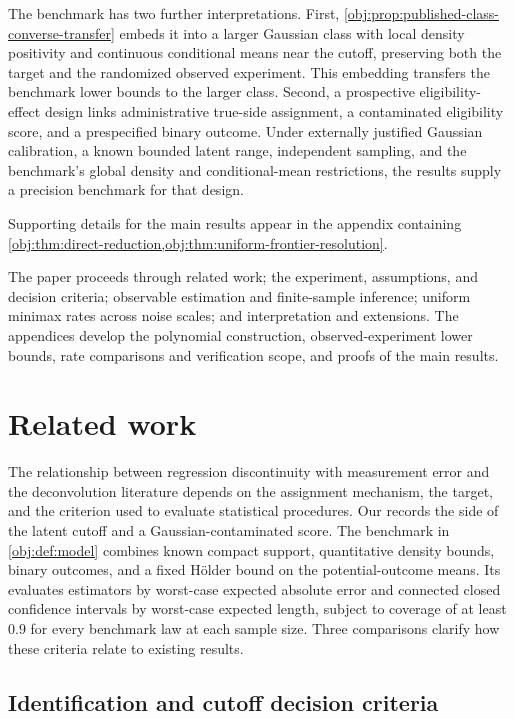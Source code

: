 \documentclass[11pt]{article}
\begin{document}
The benchmark has two further interpretations. First, \cref{obj:prop:published-class-converse-transfer} embeds it into a larger Gaussian class with local density positivity and continuous conditional means near the cutoff, preserving both the target and the randomized observed experiment. This embedding transfers the benchmark lower bounds to the larger class. Second, a prospective eligibility-effect design links administrative true-side assignment, a contaminated eligibility score, and a prespecified binary outcome. Under externally justified Gaussian calibration, a known bounded latent range, independent sampling, and the benchmark's global density and conditional-mean restrictions, the results supply a precision benchmark for that design.

Supporting details for the main results appear in the appendix containing \cref{obj:thm:direct-reduction,obj:thm:uniform-frontier-resolution}.

The paper proceeds through related work; the experiment, assumptions, and decision criteria; observable estimation and finite-sample inference; uniform minimax rates across noise scales; and interpretation and extensions. The appendices develop the polynomial construction, observed-experiment lower bounds, rate comparisons and verification scope, and proofs of the main results.


\section{Related work}\label{sec:related-work}

The relationship between regression discontinuity with measurement error and the deconvolution literature depends on the assignment mechanism, the target, and the criterion used to evaluate statistical procedures. Our  records the side of the latent cutoff and a Gaussian-contaminated score. The benchmark in \cref{obj:def:model} combines known compact support, quantitative density bounds, binary outcomes, and a fixed Hölder bound on the potential-outcome means. Its  evaluates estimators by worst-case expected absolute error and connected closed confidence intervals by worst-case expected length, subject to coverage of at least \(0.9\) for every benchmark law at each sample size. Three comparisons clarify how these criteria relate to existing results.

\subsection{Identification and cutoff decision criteria}
\end{document}
